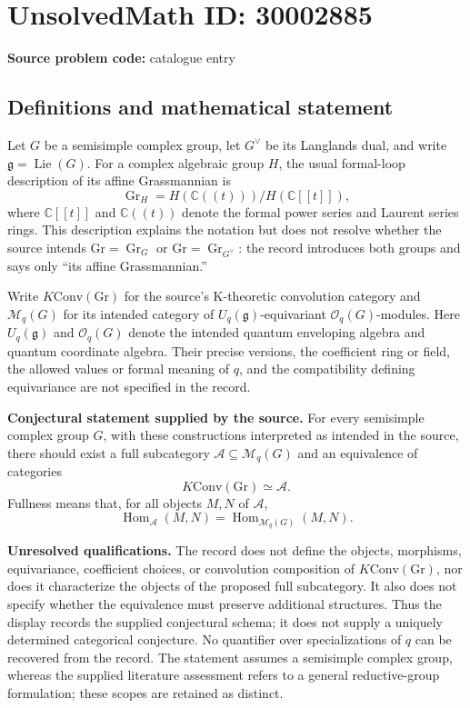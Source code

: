 \documentclass[11pt]{article}
\newcommand{\C}{\mathbb{C}}
\begin{document}
\section*{UnsolvedMath ID: 30002885}
\textbf{Source problem code:} catalogue entry
\subsection{Definitions and mathematical statement}
Let \(G\) be a semisimple complex group, let \(G^\vee\) be its Langlands dual, and write \(\mathfrak g=\operatorname{Lie}(G)\). For a complex algebraic group \(H\), the usual formal-loop description of its affine Grassmannian is
\[
\operatorname{Gr}_H=H(\C((t)))/H(\C[[t]]),
\]
where \(\C[[t]]\) and \(\C((t))\) denote the formal power series and Laurent series rings. This description explains the notation but does not resolve whether the source intends \(\mathrm{Gr}=\operatorname{Gr}_G\) or \(\mathrm{Gr}=\operatorname{Gr}_{G^\vee}\): the record introduces both groups and says only ``its affine Grassmannian.''

Write \(K\mathrm{Conv}(\mathrm{Gr})\) for the source's K-theoretic convolution category and \(\mathcal M_q(G)\) for its intended category of \(U_q(\mathfrak g)\)-equivariant \(\mathcal O_q(G)\)-modules. Here \(U_q(\mathfrak g)\) and \(\mathcal O_q(G)\) denote the intended quantum enveloping algebra and quantum coordinate algebra. Their precise versions, the coefficient ring or field, the allowed values or formal meaning of \(q\), and the compatibility defining equivariance are not specified in the record.

\textbf{Conjectural statement supplied by the source.} For every semisimple complex group \(G\), with these constructions interpreted as intended in the source, there should exist a full subcategory \(\mathcal A\subseteq\mathcal M_q(G)\) and an equivalence of categories
\[
K\mathrm{Conv}(\mathrm{Gr})\simeq\mathcal A.
\]
Fullness means that, for all objects \(M,N\) of \(\mathcal A\),
\[
\operatorname{Hom}_{\mathcal A}(M,N)
=\operatorname{Hom}_{\mathcal M_q(G)}(M,N).
\]

\textbf{Unresolved qualifications.} The record does not define the objects, morphisms, equivariance, coefficient choices, or convolution composition of \(K\mathrm{Conv}(\mathrm{Gr})\), nor does it characterize the objects of the proposed full subcategory. It also does not specify whether the equivalence must preserve additional structures. Thus the display records the supplied conjectural schema; it does not supply a uniquely determined categorical conjecture. No quantifier over specializations of \(q\) can be recovered from the record. The statement assumes a semisimple complex group, whereas the supplied literature assessment refers to a general reductive-group formulation; these scopes are retained as distinct.
\end{document}
